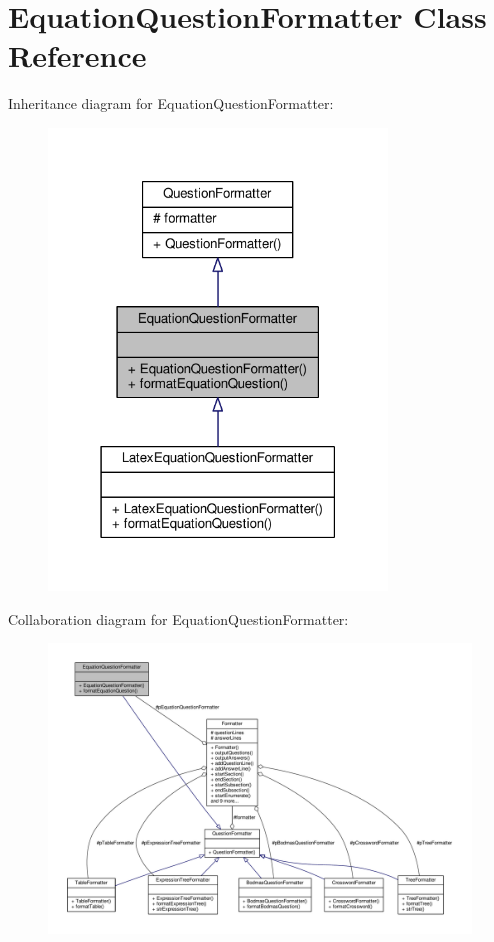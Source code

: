 \hypertarget{classEquationQuestionFormatter}{}\section{Equation\+Question\+Formatter Class Reference}
\label{classEquationQuestionFormatter}


Inheritance diagram for Equation\+Question\+Formatter\+:
\nopagebreak
\begin{figure}[H]
\begin{center}
\leavevmode
\includegraphics[width=255pt]{classEquationQuestionFormatter__inherit__graph}
\end{center}
\end{figure}


Collaboration diagram for Equation\+Question\+Formatter\+:
\nopagebreak
\begin{figure}[H]
\begin{center}
\leavevmode
\includegraphics[width=350pt]{classEquationQuestionFormatter__coll__graph}
\end{center}
\end{figure}
